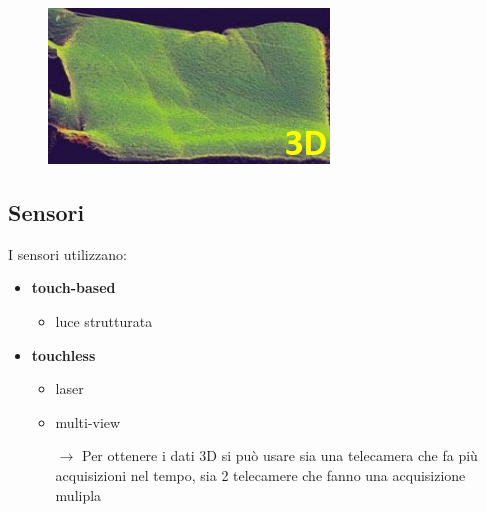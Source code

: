 \documentclass{report}
\begin{document}
\begin{figure}[ht]
    \centering
    \includegraphics[width=0.8\linewidth]{images/3d-palm.png}
\end{figure}

\subsection{Sensori}

\noindent I sensori utilizzano:
\begin{itemize}
    \item \textbf{touch-based}
    \begin{itemize}
        \item luce strutturata
    \end{itemize}
    \item \textbf{touchless}
    \begin{itemize}
        \item laser
        \item multi-view
        
        $\rightarrow$  Per ottenere i dati 3D si può usare sia una telecamera che fa più acquisizioni nel tempo, 
        sia 2 telecamere che fanno una acquisizione mulipla
    \end{itemize}
\end{itemize}
\end{document}
